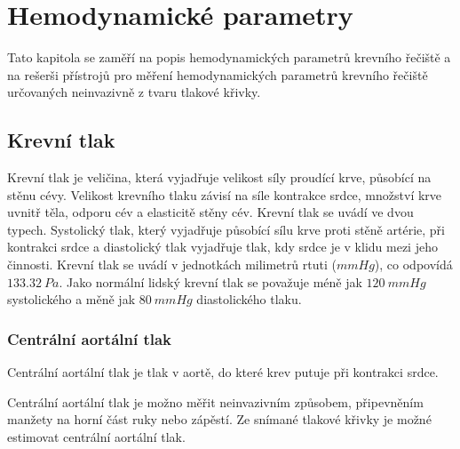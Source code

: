 \chapter{Hemodynamické parametry}
Tato kapitola se zaměří na popis hemodynamických parametrů krevního řečiště a na rešerši přístrojů pro měření hemodynamických parametrů krevního řečiště určovaných neinvazivně z tvaru
tlakové křivky.
\section{Krevní tlak}
Krevní tlak je veličina, která vyjadřuje velikost síly proudící krve, působící na stěnu cévy. Velikost krevního tlaku závisí na síle kontrakce srdce, množství krve uvnitř těla,
odporu cév a elasticitě stěny cév. Krevní tlak se uvádí ve dvou typech. Systolický tlak, který vyjadřuje působící sílu krve proti stěně artérie, při kontrakci srdce a diastolický tlak vyjadřuje
tlak, kdy srdce je v klidu mezi jeho činnosti. Krevní tlak se uvádí v jednotkách milimetrů rtuti ($mmHg$), co odpovídá $133.32 \  Pa$. Jako normální lidský krevní tlak se považuje méně jak $120 \ mmHg$ systolického a měně jak  $80 \ mmHg$ diastolického tlaku.
\cite{cite:BP}

\subsection{Centrální aortální tlak}
Centrální aortální tlak je tlak v aortě, do které krev putuje při kontrakci srdce.\cite{cite:CBP}\par
Centrální aortální tlak je možno měřit neinvazivním způsobem, připevněním manžety na horní část ruky nebo zápěstí. Ze snímané tlakové křivky je
možné estimovat centrální aortální tlak.\cite{cite:CBP}

